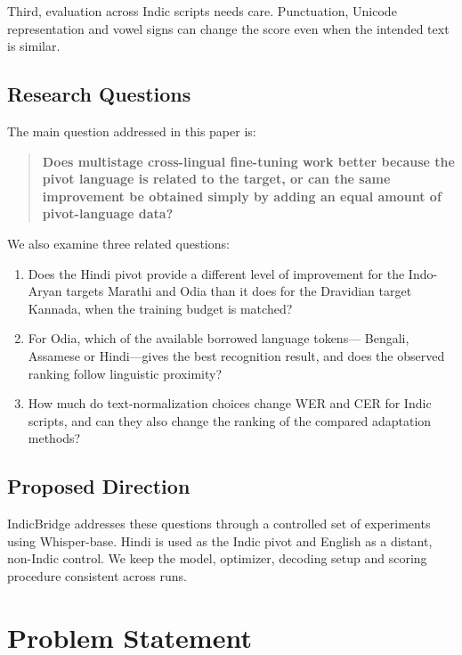 \documentclass[conference]{IEEEtran}
\begin{document}
Third, evaluation across Indic scripts needs care. Punctuation,
Unicode representation and vowel signs can change the score even when
the intended text is similar.

\subsection{Research Questions}

The main question addressed in this paper is:

\begin{quote}
\textbf{Does multistage cross-lingual fine-tuning work better because
the pivot language is related to the target, or can the same improvement
be obtained simply by adding an equal amount of pivot-language data?}
\end{quote}

We also examine three related questions:

\begin{enumerate}
    \item Does the Hindi pivot provide a different level of improvement
    for the Indo-Aryan targets Marathi and Odia than it does for the
    Dravidian target Kannada, when the training budget is matched?
    \item For Odia, which of the available borrowed language tokens---
    Bengali, Assamese or Hindi---gives the best recognition result, and
    does the observed ranking follow linguistic proximity?
    \item How much do text-normalization choices change WER and CER for
    Indic scripts, and can they also change the ranking of the compared
    adaptation methods?
\end{enumerate}

\subsection{Proposed Direction}

IndicBridge addresses these questions through a controlled set of
experiments using Whisper-base. Hindi is used as the Indic pivot and
English as a distant, non-Indic control. We keep the model,
optimizer, decoding setup and scoring procedure consistent across runs.

\section{Problem Statement}
\end{document}

